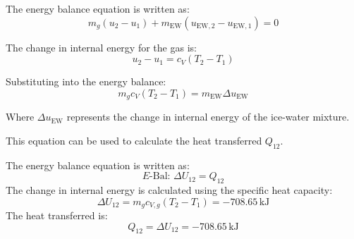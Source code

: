 The energy balance equation is written as:  
\[
m_g (u_2 - u_1) + m_{\text{EW}} (u_{\text{EW},2} - u_{\text{EW},1}) = 0
\]  

The change in internal energy for the gas is:  
\[
u_2 - u_1 = c_V (T_2 - T_1)
\]  

Substituting into the energy balance:  
\[
m_g c_V (T_2 - T_1) = m_{\text{EW}} \Delta u_{\text{EW}}
\]  

Where \( \Delta u_{\text{EW}} \) represents the change in internal energy of the ice-water mixture.  

This equation can be used to calculate the heat transferred \( Q_{12} \).

The energy balance equation is written as:  
\[
E\text{-Bal: } \Delta U_{12} = Q_{12}
\]  
The change in internal energy is calculated using the specific heat capacity:  
\[
\Delta U_{12} = m_g c_{V,g} (T_2 - T_1) = -708.65 \, \text{kJ}
\]  
The heat transferred is:  
\[
Q_{12} = \Delta U_{12} = -708.65 \, \text{kJ}
\]